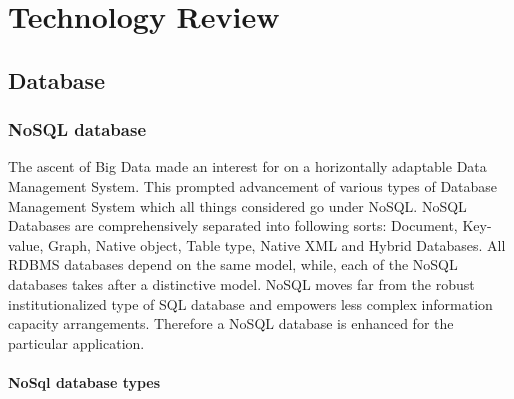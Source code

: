 \chapter{Technology Review}

\section{Database}

\subsection{NoSQL database}
The ascent of Big Data made an interest for on a horizontally adaptable Data Management System. This prompted advancement of various types of Database Management System which all things considered go under NoSQL. NoSQL Databases are comprehensively separated into following sorts: Document, Key-value, Graph, Native object, Table type, Native XML and Hybrid Databases. All RDBMS databases depend on the same model, while, each of the NoSQL databases takes after a distinctive model. NoSQL moves far from the robust institutionalized type of SQL database and empowers less complex information capacity arrangements. Therefore a NoSQL database is enhanced for the particular application.\cite{noSql}

\subsubsection{NoSql database types}

